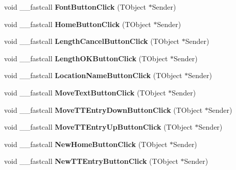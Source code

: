 \begin{DoxyCompactItemize}
void \+\_\+\+\_\+fastcall {\bfseries Font\+Button\+Click} (T\+Object $\ast$Sender)
\item 
\mbox{\label{class_t_interface_a19e64ee6952b0fd3c260eb05c14a34c8}} 
void \+\_\+\+\_\+fastcall {\bfseries Home\+Button\+Click} (T\+Object $\ast$Sender)
\item 
\mbox{\label{class_t_interface_a5e7eff5bd235780252147bb4878a4c95}} 
void \+\_\+\+\_\+fastcall {\bfseries Length\+Cancel\+Button\+Click} (T\+Object $\ast$Sender)
\item 
\mbox{\label{class_t_interface_ab34f55bab5984b72264d7275660a3463}} 
void \+\_\+\+\_\+fastcall {\bfseries Length\+O\+K\+Button\+Click} (T\+Object $\ast$Sender)
\item 
\mbox{\label{class_t_interface_aef9267dd01da25269797e2e8ca08a3f9}} 
void \+\_\+\+\_\+fastcall {\bfseries Location\+Name\+Button\+Click} (T\+Object $\ast$Sender)
\item 
\mbox{\label{class_t_interface_af6e215dac581f32894a3216aa3d02ca2}} 
void \+\_\+\+\_\+fastcall {\bfseries Move\+Text\+Button\+Click} (T\+Object $\ast$Sender)
\item 
\mbox{\label{class_t_interface_a64926df4f293df9f038ce8c78e0201bb}} 
void \+\_\+\+\_\+fastcall {\bfseries Move\+T\+T\+Entry\+Down\+Button\+Click} (T\+Object $\ast$Sender)
\item 
\mbox{\label{class_t_interface_a768f6e8fb12c5a77b591e223ef10a46d}} 
void \+\_\+\+\_\+fastcall {\bfseries Move\+T\+T\+Entry\+Up\+Button\+Click} (T\+Object $\ast$Sender)
\item 
\mbox{\label{class_t_interface_a77c402ebf53d182c76821a44f5895d98}} 
void \+\_\+\+\_\+fastcall {\bfseries New\+Home\+Button\+Click} (T\+Object $\ast$Sender)
\item 
\mbox{\label{class_t_interface_a889fff98fb93d17aefc0a341a8216e72}} 
void \+\_\+\+\_\+fastcall {\bfseries New\+T\+T\+Entry\+Button\+Click} (T\+Object $\ast$Sender)
\item 
\mbox{\label{class_t_interface_a8d9fefd50730926d40c89801a70b8c95}} 

\end{DoxyCompactItemize}
